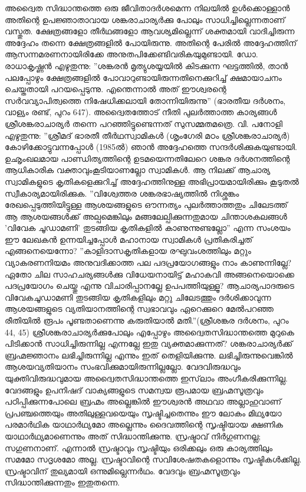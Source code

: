 അദ്വൈത സിദ്ധാന്തത്തെ ഒരു ജീവിതാദര്‍ശമെന്ന നിലയില്‍ ഉള്‍ക്കൊള്ളാന്‍ അതിന്റെ ഉപജ്ഞാതാവായ ശങ്കരാചാര്യര്‍ക്കു പോലും സാധിച്ചില്ലെന്നതാണ് വസ്തുത. ക്ഷേത്രങ്ങളോ തീര്‍ഥങ്ങളോ ആവശ്യമില്ലെന്ന് ശക്തമായി വാദിച്ചിരുന്ന അദ്ദേഹം തന്നെ ക്ഷേത്രങ്ങളില്‍ പോയിരുന്നു. അതിന്റെ പേരില്‍ അദ്ദേഹത്തിന് ആസന്നമരണനായിരിക്കേ അനുതപിക്കേണ്ടിവരികയുമുണ്ടായി. ഡോ. രാധാകൃഷ്ണന്‍ എഴുതുന്നു: ''ശങ്കരന്‍ മൃത്യുശയ്യയില്‍ കിടക്കുന്ന ഘട്ടത്തില്‍, താന്‍ പലപ്പോഴും ക്ഷേത്രങ്ങളില്‍ പോവാറുണ്ടായിരുന്നതിനെക്കുറിച്ച് ക്ഷമായാചനം ചെയ്തതായി പറയപ്പെടുന്നു. എന്തെന്നാല്‍ അത് ഈശ്വരന്റെ സര്‍വവ്യാപിത്വത്തെ നിഷേധിക്കലായി തോന്നിയിരുന്നു'' (ഭാരതീയ ദര്‍ശനം, വാള്യം രണ്ട്, പുറം 647).
അദ്വൈതത്തോട് നീതി പുലര്‍ത്താത്ത കാര്യങ്ങള്‍ ശ്രീശങ്കരാചാര്യര്‍ തന്നെ പറഞ്ഞിട്ടുണ്ടെന്നത് സുസമ്മതമത്രെ. വി. പനോളി എഴുതുന്നു: ''ശ്രീമദ് ഭാരതീ തീര്‍ഥസ്വാമികള്‍ (ശൃംഗേരി മഠം ശ്രീശങ്കരാചാര്യര്‍) കോഴിക്കോട്ടുവന്നപ്പോള്‍ (1985ല്‍) ഞാന്‍ അദ്ദേഹത്തെ സന്ദര്‍ശിക്കുകയുണ്ടായി. ഉഛൃംഖലമായ പാണ്ഡിത്യത്തിന്റെ ഉടമയെന്നതിലേറെ ശങ്കര ദര്‍ശനത്തിന്റെ ആധികാരിക വക്താവുംകൂടിയാണല്ലോ സ്വാമികള്‍. ആ നിലക്ക് ആചാര്യ സ്വാമികളുടെ കൃതികളെക്കുറിച്ച് അദ്ദേഹത്തിനുള്ള അഭിപ്രായമായിരിക്കും കൂടുതല്‍ സ്വീകാര്യമായിരിക്കുക. ''വിശ്വേത്തര ശങ്കരഭാഷ്യത്തില്‍ നിശ്ശങ്കം രേഖപ്പെടുത്തിയിട്ടുള്ള ആശയങ്ങളുടെ ഔന്നത്യം പുലര്‍ത്താത്തതും ചിലേടത്ത് ആ ആശയങ്ങള്‍ക്ക് അല്പമെങ്കിലും മങ്ങലേല്പിക്കുന്നതുമായ ചിന്താശകലങ്ങള്‍ 'വിവേക ചൂഡാമണി' തുടങ്ങിയ കൃതികളില്‍ കാണുന്നുണ്ടല്ലോ'' എന്ന സംശയം ഈ ലേഖകന്‍ ഉന്നയിച്ചപ്പോള്‍ മഹാനായ സ്വാമികള്‍ പ്രതികരിച്ചത് എങ്ങനെയെന്നോ?
''കാളിദാസകൃതികളായ രഘുവംശത്തിലും മറ്റും വ്യാകരണനിയമം അനുവദിക്കാത്ത പല പദപ്രയോഗങ്ങളും നാം കാണുന്നില്ലേ? ഏതോ ചില സാഹചര്യങ്ങള്‍ക്കു വിധേയനായിട്ട് മഹാകവി അങ്ങനെയൊക്കെ പദപ്രയോഗം ചെയ്തു എന്നു വിചാരിപ്പാനല്ലേ ഉപപത്തിയുള്ളൂ? ആചാര്യപാദരുടെ വിവേകചൂഡാമണി തുടങ്ങിയ കൃതികളിലും മറ്റു ചിലേടത്തും ദര്‍ശിക്കാവുന്ന ആശയങ്ങളുടെ വ്യതിയാനത്തിന്റെ സ്വഭാവവും ഏറെക്കുറെ മേല്‍പറഞ്ഞ രീതിയില്‍ രൂപം പൂണ്ടതാണെന്നു കരുതിയാല്‍ മതി.''(ശ്രീശങ്കര ദര്‍ശനം, പുറം 44, 45)
ശ്രീശങ്കരാചാര്യര്‍ക്കുപോലും എപ്പോഴും അദ്വൈതസിദ്ധാന്തത്തെ മുറുകെ പിടിക്കാന്‍ സാധിച്ചിരുന്നില്ല എന്നല്ലേ ഇതു വ്യക്തമാക്കുന്നത്? ശങ്കരാചാര്യര്‍ക്ക് ബ്രഹ്മജ്ഞാനം ലഭിച്ചിരുന്നില്ല എന്നും ഇത് തെളിയിക്കുന്നു. ലഭിച്ചിരുന്നുവെങ്കില്‍ ആശയവ്യതിയാനം സംഭവിക്കുമായിരുന്നില്ലല്ലോ.
വേദവിരുദ്ധവും യുക്തിവിരുദ്ധവുമായ അദ്വൈതസിദ്ധാന്തത്തെ ഇസ്‌ലാം അംഗീകരിക്കുന്നില്ല. വേദങ്ങളും ഉപനിഷദ് വാക്യങ്ങളുടെ സമന്വയ രൂപമായ ബ്രഹ്മസൂത്രവും പഠിപ്പിക്കുന്നപോലെ ബ്രഹ്മം അല്ലെങ്കില്‍ ഈശ്വരന്‍ അഥവാ അല്ലാഹുവാണ് പ്രപഞ്ചത്തെയും അതിലുള്ളവയെയും സൃഷ്ടിച്ചതെന്നും ഈ ലോകം മിഥ്യയോ പരമാര്‍ഥിക യാഥാര്‍ഥ്യമോ അല്ലെന്നും ദൈവത്തിന്റെ സൃഷ്ടിയായ ക്ഷണിക യാഥാര്‍ഥ്യമാണെന്നും അത് സിദ്ധാന്തിക്കുന്നു. സ്രഷ്ടാവ് നിര്‍ഗുണനല്ല; സഗുണനാണ്. എന്നാല്‍ സ്രഷ്ടാവും സൃഷ്ടിയും ഒരിക്കലും ഒരു കാര്യത്തിലും സമമോ സദൃശമോ അല്ല. സ്രഷ്ടാവിന്റെ സവിശേഷതകളൊന്നും സൃഷ്ടികള്‍ക്കില്ല. സ്രഷ്ടാവിന് തുല്യമായി ഒന്നുമില്ലെന്നര്‍ഥം. വേദവും ബ്രഹ്മസൂത്രവും സിദ്ധാന്തിക്കുന്നതും ഇതുതന്നെ.
